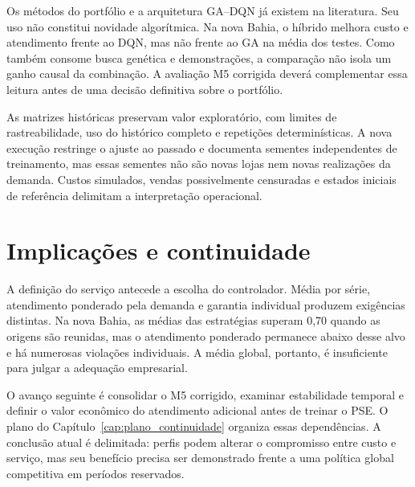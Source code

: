 Os métodos do portfólio e a arquitetura GA--DQN já existem na literatura. Seu uso não constitui novidade algorítmica. Na nova Bahia, o híbrido melhora custo e atendimento frente ao DQN, mas não frente ao GA na média dos testes. Como também consome busca genética e demonstrações, a comparação não isola um ganho causal da combinação. A avaliação M5 corrigida deverá complementar essa leitura antes de uma decisão definitiva sobre o portfólio.

As matrizes históricas preservam valor exploratório, com limites de rastreabilidade, uso do histórico completo e repetições determinísticas. A nova execução restringe o ajuste ao passado e documenta sementes independentes de treinamento, mas essas sementes não são novas lojas nem novas realizações da demanda. Custos simulados, vendas possivelmente censuradas e estados iniciais de referência delimitam a interpretação operacional.

\section{Implicações e continuidade}

A definição do serviço antecede a escolha do controlador. Média por série, atendimento ponderado pela demanda e garantia individual produzem exigências distintas. Na nova Bahia, as médias das estratégias superam 0,70 quando as origens são reunidas, mas o atendimento ponderado permanece abaixo desse alvo e há numerosas violações individuais. A média global, portanto, é insuficiente para julgar a adequação empresarial.

O avanço seguinte é consolidar o M5 corrigido, examinar estabilidade temporal e definir o valor econômico do atendimento adicional antes de treinar o PSE. O plano do Capítulo~\ref{cap:plano_continuidade} organiza essas dependências. A conclusão atual é delimitada: perfis podem alterar o compromisso entre custo e serviço, mas seu benefício precisa ser demonstrado frente a uma política global competitiva em períodos reservados.
